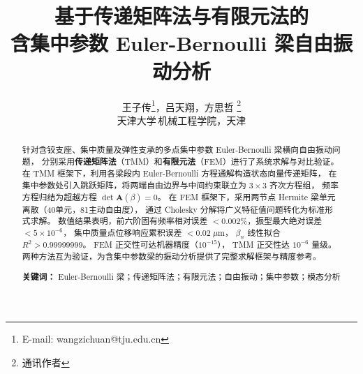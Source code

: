 \documentclass[twoside,12pt]{ctexart}
\title{\textbf{\Large 基于传递矩阵法与有限元法的\\含集中参数 Euler-Bernoulli 梁自由振动分析}}
\author{王子传\thanks{E-mail: wangzichuan@tju.edu.cn}，吕天翔，方思哲%
       \footnote{通讯作者}\\[4pt]
       \small 天津大学\,机械工程学院，天津\;300350}
\date{}
\newcommand{\betan}{\beta_n}
\begin{document}
\maketitle

\begin{abstract}
\noindent
针对含铰支座、集中质量及弹性支承的多点集中参数 Euler-Bernoulli 梁横向自由振动问题，
分别采用\textbf{传递矩阵法}（TMM）和\textbf{有限元法}（FEM）进行了系统求解与对比验证。
在 TMM 框架下，利用各梁段内 Euler-Bernoulli 方程通解构造状态向量传递矩阵，
在集中参数处引入跳跃矩阵，将两端自由边界与中间约束联立为 $3\times 3$ 齐次方程组，
频率方程归结为超越方程 $\det\mathbf{A}(\beta)=0$。
在 FEM 框架下，采用两节点 Hermite 梁单元离散（40单元，81主动自由度），
通过 Cholesky 分解将广义特征值问题转化为标准形式求解。
数值结果表明，前六阶固有频率相对误差 $<0.002\%$，振型最大绝对误差 $<5\times10^{-6}$，
集中质量点位移响应累积误差 $<0.02\;\mu\text{m}$，
$\betan$ 线性拟合 $R^2 > 0.99999999$。
FEM 正交性可达机器精度（$10^{-15}$），
TMM 正交性达 $10^{-6}$ 量级。
两种方法互为验证，为含集中参数梁的振动分析提供了完整求解框架与精度参考。

\vspace{1ex}
\noindent\textbf{关键词：} Euler-Bernoulli 梁；传递矩阵法；有限元法；自由振动；集中参数；模态分析
\end{abstract}
\end{document}
